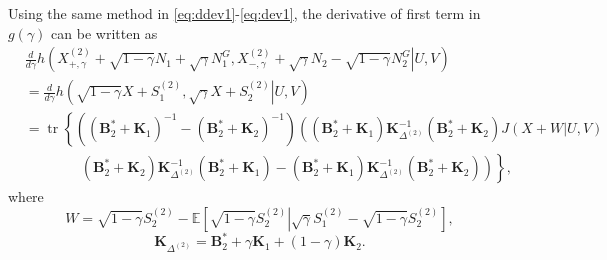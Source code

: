 \documentclass[journal,final, onecolumn]{IEEEtran}
\DeclareMathOperator{\tr}{tr}
\begin{document}
Using the same method in \eqref{eq:ddev1}-\eqref{eq:dev1}, the derivative of first term in $g(\gamma)$ can be written as
\begin{align}
&\frac{d}{d\gamma} h \left(\left. X^{(2)}_{+,\gamma}+\sqrt{1-\gamma}N_{1} + \sqrt{\gamma} N_{1}^{G}, X^{(2)}_{-,\gamma}+\sqrt{\gamma}N_{2} - \sqrt{1-\gamma} N_{2}^{G} \right| U,V\right) \nonumber \\
&=\frac{d}{d\gamma} h\left( \left. \sqrt{1-\gamma}X+S^{(2)}_{1} ,  \sqrt{\gamma}X+S^{(2)}_{2} \right| U,V     \right) \\
& =\tr \left\{  \left(     (\boldsymbol{B}_{2}^{*} + \boldsymbol{K}_{1})^{-1} - (\boldsymbol{B}_{2}^{*} + \boldsymbol{K}_{2})^{-1}  \right) \left(   (\boldsymbol{B}_{2}^{*} + \boldsymbol{K}_{1}) \boldsymbol{K}^{-1}_{\Delta^{(2)}}(\boldsymbol{B}_{2}^{*} + \boldsymbol{K}_{2}) J(X+W| U,V) \right.\right.\nonumber \\
& \qquad \qquad \left.\left. (\boldsymbol{B}_{2}^{*} + \boldsymbol{K}_{2}) \boldsymbol{K}^{-1}_{\Delta^{(2)}}(\boldsymbol{B}_{2}^{*} + \boldsymbol{K}_{1}) -(\boldsymbol{B}_{2}^{*} + \boldsymbol{K}_{1}) \boldsymbol{K}^{-1}_{\Delta^{(2)}}(\boldsymbol{B}_{2}^{*} + \boldsymbol{K}_{2})     \right)         \right\},\label{eqn:subto_2}
\end{align}
where
\begin{equation}
W=\sqrt{1-\gamma} S^{(2)}_2 - \mathbb{E} \left[ \sqrt{1-\gamma} S^{(2)}_2 \left| \sqrt{\gamma} S^{(2)}_{1}-\sqrt{1-\gamma} S^{(2)}_2    \right.   \right],\label{eqn:W_2}
\end{equation}
\begin{equation}
\boldsymbol{K}_{\Delta^{(2)}} = \boldsymbol{B}_{2}^{*} + \gamma \boldsymbol{K}_{1} + (1-\gamma) \boldsymbol{K}_{2}. \label{eqn:KW2}
\end{equation}
\end{document}
